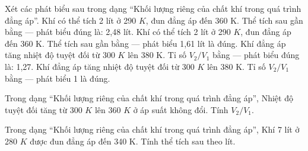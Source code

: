 \begin{ex}
Xét các phát biểu sau trong dạng “Khối lượng riêng của chất khí trong quá trình đẳng áp”.
\choiceTF
{\True Khí có thể tích 2 lít ở 290 $K$, đun đẳng áp đến 360 K. Thể tích sau gần bằng — phát biểu đúng là: 2,48 lít.}
{Khí có thể tích 2 lít ở 290 $K$, đun đẳng áp đến 360 K. Thể tích sau gần bằng — phát biểu 1,61 lít là đúng.}
{\True Khí đẳng áp tăng nhiệt độ tuyệt đối từ 300 $K$ lên 380 K. Tỉ số $V_2/V_1$ bằng — phát biểu đúng là: 1,27.}
{Khí đẳng áp tăng nhiệt độ tuyệt đối từ 300 $K$ lên 380 K. Tỉ số $V_2/V_1$ bằng — phát biểu 1 là đúng.}
\end{ex}

\begin{bt}
Trong dạng “Khối lượng riêng của chất khí trong quá trình đẳng áp”, Nhiệt độ tuyệt đối tăng từ 300 $K$ lên 360 $K$ ở áp suất không đổi. Tính $V_2/V_1$.
\end{bt}

\begin{ex}
Trong dạng “Khối lượng riêng của chất khí trong quá trình đẳng áp”, Khí 7 lít ở 280 $K$ được đun đẳng áp đến 340 K. Tính thể tích sau theo lít.
\end{ex}

